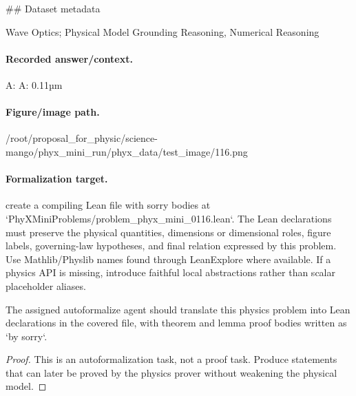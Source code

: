 \#\# Dataset metadata

Wave Optics; Physical Model Grounding Reasoning, Numerical Reasoning

\paragraph{Recorded answer/context.}
A: A: 0.11µm

\paragraph{Figure/image path.}
/root/proposal\_for\_physic/science-mango/phyx\_mini\_run/phyx\_data/test\_image/116.png

\paragraph{Formalization target.}
create a compiling Lean file with sorry bodies at `PhyXMiniProblems/problem\_phyx\_mini\_0116.lean`. The Lean declarations must preserve the physical quantities, dimensions or dimensional roles, figure labels, governing-law hypotheses, and final relation expressed by this problem.
Use Mathlib/Physlib names found through LeanExplore where available. If a physics API is missing, introduce faithful local abstractions rather than scalar placeholder aliases.

\begin{theorem}
\label{thm:physics:phyx_mini_0116:target}
The assigned autoformalize agent should translate this physics problem into Lean declarations in the covered file, with theorem and lemma proof bodies written as `by sorry`.
\end{theorem}
\begin{proof}
This is an autoformalization task, not a proof task. Produce statements that can later be proved by the physics prover without weakening the physical model.
\end{proof}

